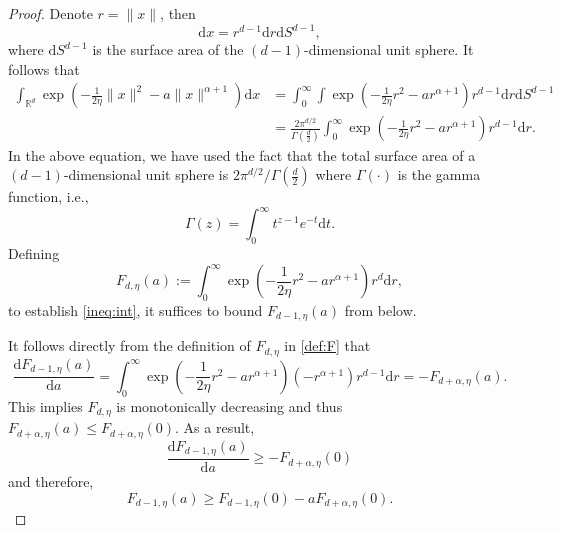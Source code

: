 \documentclass[11pt,letterpaper]{article}
\newcommand{\nn}{\nonumber}
\newcommand{\R}{\mathbb{R}}
\newcommand{\rd}{\mathrm{d}}
\begin{document}
\begin{proof}
Denote $r=\|x\|$, then
\[
\rd x= r^{d-1} \rd r \rd S^{d-1},
\]
where $ \rd S^{d-1} $ is the surface area of the $ (d-1) $-dimensional unit sphere.
It follows that
\begin{align}
  \int_{\R^d} \exp\left(-\frac{1}{2\eta}\|x\|^2 - a\|x\|^{\alpha+1} \right) \rd x &= \int_0^\infty \int \exp\left(-\frac{1}{2\eta}r^2 - a r^{\alpha+1} \right) r^{d-1} \rd r \rd S^{d-1} \nn \\
&= \frac{2 \pi^{d/2}}{\Gamma\left( \frac d2 \right) } \int_0^\infty \exp\left( -\frac{1}{2\eta}r^2 - a r^{\alpha+1} \right) r^{d-1} \rd r.  \label{eq:int}
\end{align}
In the above equation, we have used the fact that the total surface area of a $ (d-1) $-dimensional unit sphere is $2 \pi^{d/2}/\Gamma\left( \frac d2 \right)$ where $\Gamma(\cdot)$ is the gamma function, i.e.,
\begin{equation}\label{eq:gamma}
        \Gamma(z)=\int_0^\infty t^{z-1} e^{-t} \rd t.
    \end{equation} 
Defining
\begin{equation}\label{def:F}
    F_{d,\eta}(a):= \int_0^\infty \exp\left( -\frac{1}{2\eta}r^2 - a r^{\alpha+1} \right) r^{d} \rd r,
\end{equation}
to establish \eqref{ineq:int},
it suffices to bound $F_{d-1,\eta}(a)$ from below.

It follows directly from the definition of $F_{d,\eta}$ in \eqref{def:F} that
\[
\frac{\rd F_{d-1,\eta}(a)}{\rd a}=\int_0^\infty \exp\left( -\frac{1}{2\eta}r^2 - a r^{\alpha+1} \right) (-r^{\alpha+1}) r^{d-1} \rd r 
=- F_{d+\alpha,\eta}(a).
\]
This implies $F_{d,\eta}$ is monotonically decreasing and thus $F_{d+\alpha,\eta}(a)\le F_{d+\alpha,\eta}(0)$. As a result,
    \[
        \frac{\rd F_{d-1,\eta}(a)}{\rd a} \ge - F_{d+\alpha,\eta}(0)
    \]
and therefore,
\begin{equation}\label{ineq:F}
    F_{d-1,\eta}(a) \ge F_{d-1,\eta}(0) - a F_{d+\alpha,\eta}(0).
\end{equation}


\end{proof}
\end{document}
